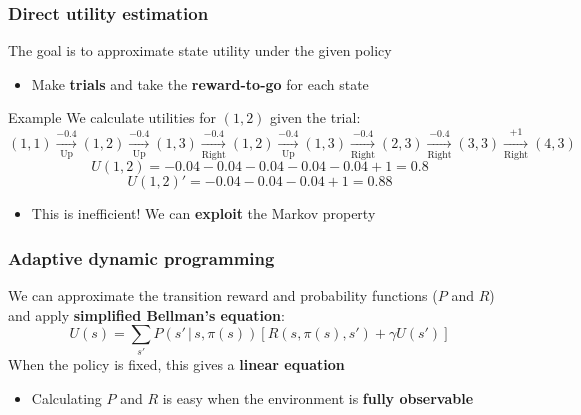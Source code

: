 \documentclass{beamer}
\begin{document}
\begin{frame}
	\frametitle{Direct utility estimation}
	The goal is to approximate state utility under the given policy
	\begin{itemize}
		\item Make \textbf{trials} and take the \textbf{reward-to-go} for each state
	\end{itemize}
	\pause
	\begin{block}{Example}
	We calculate utilities for $(1,2)$ given the trial:
		$$
		\scriptstyle
		(1,1) \xrightarrow[\text{Up}]{-0.4} 
		(1,2) \xrightarrow[\text{Up}]{-0.4}
		(1,3) \xrightarrow[\text{Right}]{-0.4}
		(1,2) \xrightarrow[\text{Up}]{-0.4}
		(1,3) \xrightarrow[\text{Right}]{-0.4}
		(2,3) \xrightarrow[\text{Right}]{-0.4}
		(3,3) \xrightarrow[\text{Right}]{+1}
		(4,3)
	$$
	\pause
	$$
		U(1,2) = -0.04 -0.04 -0.04 -0.04 -0.04 + 1 = 0.8
	$$
	\pause
	$$
		U(1,2)' = -0.04 -0.04 -0.04 + 1 = 0.88
	$$
	\end{block}
	\pause
	\begin{itemize}
		\item This is inefficient! We can \textbf{exploit} the Markov property 
	\end{itemize}
\end{frame}

\begin{frame}
	\frametitle{Adaptive dynamic programming}
	We can approximate the transition reward and probability functions ($P$ and $R$) and apply \textbf{simplified Bellman's equation}:
	$$
		U(s) = \sum_{s'} P(s' \, | \, s, \pi(s)) \left[ R(s, \pi(s), s') + \gamma U(s') \right]
	$$
	When the policy is fixed, this gives a \textbf{linear equation}
	\pause
	\begin{itemize}
		\item Calculating $P$ and $R$ is easy when the environment is \textbf{fully observable} 
	\end{itemize}
\end{frame}
\end{document}
